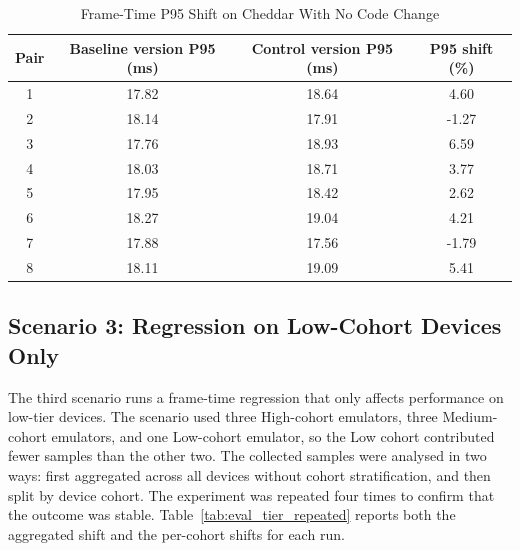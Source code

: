 \begin{table}[htbp]
    \centering
    \small
    \caption{Frame-Time P95 Shift on Cheddar With No Code Change}
    \label{tab:eval_cheddar_noise}
    \begin{tabular}{cccc}
        \toprule
        Pair & Baseline version P95 (ms) & Control version P95 (ms) & P95 shift (\%) \\
        \midrule
        1    & 17.82                     & 18.64                    & 4.60           \\
        2    & 18.14                     & 17.91                    & -1.27          \\
        3    & 17.76                     & 18.93                    & 6.59           \\
        4    & 18.03                     & 18.71                    & 3.77           \\
        5    & 17.95                     & 18.42                    & 2.62           \\
        6    & 18.27                     & 19.04                    & 4.21           \\
        7    & 17.88                     & 17.56                    & -1.79          \\
        8    & 18.11                     & 19.09                    & 5.41           \\
        \bottomrule
    \end{tabular}
\end{table}


\subsection{Scenario 3: Regression on Low-Cohort Devices Only}
\label{sec:eval_fragmentation}

The third scenario runs a frame-time regression that only affects performance on low-tier devices. The scenario used three High-cohort emulators, three Medium-cohort emulators, and one Low-cohort emulator, so the Low cohort contributed fewer samples than the other two. The collected samples were analysed in two ways: first aggregated across all devices without cohort stratification, and then split by device cohort. The experiment was repeated four times to confirm that the outcome was stable. Table~\ref{tab:eval_tier_repeated} reports both the aggregated shift and the per-cohort shifts for each run.

